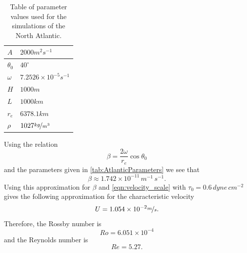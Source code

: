 \begin{table}
  \begin{center}
  \begin{tabular}{|l|l|}
    \hline
    $A$ & $2000m^2s^{-1}$\\
    \hline
    $\theta_0$ & $40^\circ$ \\
    \hline
    $\omega$ & $7.2526\times 10^{-5}s^{-1}$ \\
    \hline
    $H$ & $1000m$ \\
    \hline
    $L$ & $1000km$ \\
    \hline
    $r_e$ & $6378.1km$ \\
    \hline
    $\rho$ & $1027 \nicefrac{kg}{m^3}$ \\
    \hline
  \end{tabular}
  \end{center}
  \caption{Table of parameter values used for the simulations of the North
    Atlantic. \cite{delSastre04}}
  \label{tab:AtlanticParameters}
\end{table}

Using the relation
\begin{equation}
  \beta = \frac{2\omega}{r_e}\cos \theta_0
  \label{eqn:Beta}
\end{equation}
and the parameters given in \autoref{tab:AtlanticParameters} we see that
\begin{equation*}
  \beta \approx 1.742\times 10^{-11}\, m^{-1}\,s^{-1}.
\end{equation*}
Using this approximation for $\beta$ and \eqref{eqn:velocity_scale} with
$\tau_0 = 0.6\, dyne\, cm^{-2}$ \cite{Hellerman} gives the following
approximation for the characteristic velocity
\begin{equation*}
    U = 1.054\times 10^{-2} \nicefrac{m}{s}.
\end{equation*}
Therefore, the Rossby number is
\begin{equation*}
  Ro = 6.051\times 10^{-4}
\end{equation*}
and the Reynolds number is
\begin{equation*}
  Re = 5.27.
\end{equation*}

